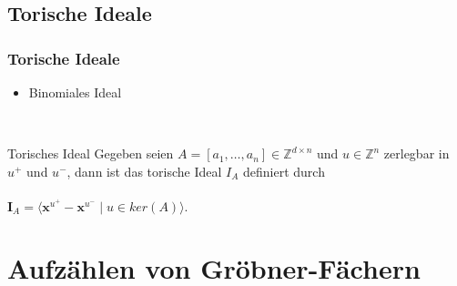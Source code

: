 \documentclass{beamer}
\begin{document}
\subsection{Torische Ideale}

\begin{frame}[fragile]
\frametitle{Torische Ideale}

\begin{itemize}
\item Binomiales Ideal
\end{itemize}
~\\
\begin{block}{Torisches Ideal}
Gegeben seien $A =\left[a_{1},\dots, a_{n}  \right] \in \mathbb{Z}^{d \times n } $ und $u \in \mathbb{Z}^{n}$ zerlegbar in $u^{+}$ und $u^{-}$, dann ist das torische Ideal $I_{A}$ definiert durch \\
~\\
\centering
$ \textbf{I}_{A} = \langle \textbf{x}^{u^{+}} - \textbf{x}^{u^{-}} \mid u \in ker \left(  A \right) \rangle . $ 

\end{block}


\end{frame}
\section{Aufzählen von Gröbner-Fächern}

\end{document}
